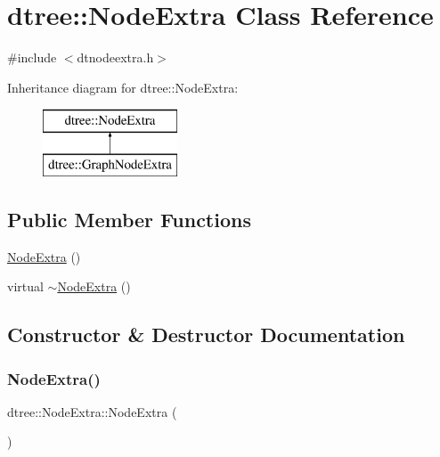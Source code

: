 \hypertarget{classdtree_1_1_node_extra}{}\section{dtree\+::Node\+Extra Class Reference}
\label{classdtree_1_1_node_extra}


{\ttfamily \#include $<$dtnodeextra.\+h$>$}

Inheritance diagram for dtree\+::Node\+Extra\+:\begin{figure}[H]
\begin{center}
\leavevmode
\includegraphics[height=2.000000cm]{d9/dc5/classdtree_1_1_node_extra}
\end{center}
\end{figure}
\subsection*{Public Member Functions}
\begin{DoxyCompactItemize}
\item 
\mbox{\hyperlink{classdtree_1_1_node_extra_aed2bfc21bc0ce673cad78c2fdce88608}{Node\+Extra}} ()
\item 
virtual \mbox{\hyperlink{classdtree_1_1_node_extra_aa28add6fabeb46077f85e983b3682816}{$\sim$\+Node\+Extra}} ()
\end{DoxyCompactItemize}


\subsection{Constructor \& Destructor Documentation}
\mbox{\label{classdtree_1_1_node_extra_aed2bfc21bc0ce673cad78c2fdce88608}} 
\subsubsection{\texorpdfstring{NodeExtra()}{NodeExtra()}}
{\footnotesize\ttfamily dtree\+::\+Node\+Extra\+::\+Node\+Extra (\begin{DoxyParamCaption}{ }\end{DoxyParamCaption})\hspace{0.3cm}{\ttfamily [inline]}}

